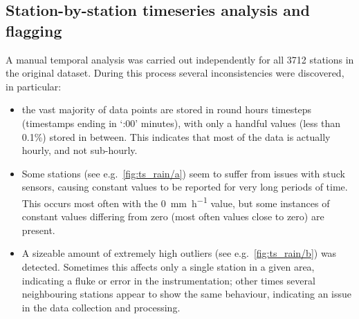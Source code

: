 \subsection{Station-by-station timeseries analysis and flagging}
A manual temporal analysis was carried out independently for all 3712 stations in the original dataset. During this process several inconsistencies were discovered, in particular:
\begin{itemize}
    \item the vast majority of data points are stored in round hours timesteps (timestamps ending in `:00' minutes), with only a handful values (less than 0.1\%) stored in between. This indicates that most of the data is actually hourly, and not sub-hourly.
    \item Some stations (see e.g.\ \cref{fig:ts_rain/a}) seem to suffer from issues with stuck sensors, causing constant values to be reported for very long periods of time. This occurs most often with the \SI{0}{\milli\metre\per\hour} value, but some instances of constant values differing from zero (most often values close to zero) are present.
    \item A sizeable amount of extremely high outliers (see e.g.\ \cref{fig:ts_rain/b}) was detected. Sometimes this affects only a single station in a given area, indicating a fluke or error in the instrumentation; other times several neighbouring stations appear to show the same behaviour, indicating an issue in the data collection and processing.
\end{itemize}

